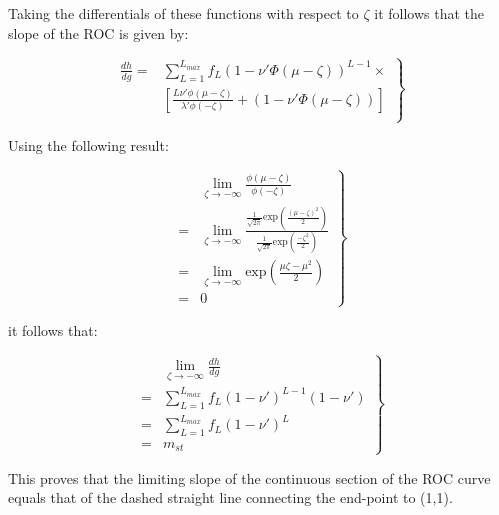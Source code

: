 \documentclass[
]{book}
\begin{document}
Taking the differentials of these functions with respect to \(\zeta\) it follows that the slope of the ROC is given by:

\begin{equation}
\left. 
\begin{aligned}
\frac{dh}{dg} =& \sum_{L=1}^{L_{max}}  f_L \left ( 1-\nu'\Phi\left ( \mu-\zeta \right ) \right )^{L-1}  \times \\
& \left [ \frac{L\nu'\phi\left ( \mu-\zeta \right )}{\lambda'\phi\left ( -\zeta \right )} + \left ( 1-\nu'\Phi \left ( \mu-\zeta \right )\right ) \right ]\\ 
\end{aligned}
\right \} 
\label{eq:rsm-pred-slope-eq4}
\end{equation}

Using the following result:

\begin{equation}
\left. 
\begin{aligned}
& \lim_{\zeta \rightarrow -\infty} \frac{\phi\left ( \mu-\zeta \right )}{\phi\left ( -\zeta \right )} \\ 
=&\lim_{\zeta \rightarrow -\infty} \frac{\frac{1}{\sqrt{2\pi}}\text{exp}\left ( \frac{\left (\mu-\zeta  \right )^2}{2} \right )}{\frac{1}{\sqrt{2\pi}}\text{exp}\left ( \frac{-\zeta^2}{2} \right )} \\
=& \lim_{\zeta \rightarrow -\infty} \text{exp}\left ( \frac{\mu\zeta-\mu^2}{2}  \right ) \\
=& 0
\end{aligned}
\right \} 
\label{eq:rsm-pred-slope-eq5}
\end{equation}

it follows that:

\begin{equation}
\left. 
\begin{aligned}
& \lim_{\zeta \rightarrow -\infty} \frac{dh}{dg} \\ 
=& \sum_{L=1}^{L_{max}} f_L \left ( 1-\nu' \right )^{L-1} \left ( 1-\nu' \right )\\
=& \sum_{L=1}^{L_{max}} f_L \left ( 1-\nu' \right )^{L} \\
=& m_{st}
\end{aligned}
\right \} 
\label{eq:rsm-pred-slope-eq6}
\end{equation}

This proves that the limiting slope of the continuous section of the ROC curve equals that of the dashed straight line connecting the end-point to (1,1).
\end{document}
